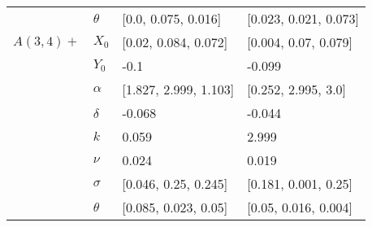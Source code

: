 \begin{tabular}{llll}
	& $\theta$ &    [0.0, 0.075, 0.016] &  [0.023, 0.021, 0.073] \\
	$A(3, 4)+$ & $X_0$ &   [0.02, 0.084, 0.072] &   [0.004, 0.07, 0.079] \\
	& $Y_0$ &                   -0.1 &                 -0.099 \\
	& $\alpha$ &  [1.827, 2.999, 1.103] &    [0.252, 2.995, 3.0] \\
	& $\delta$ &                 -0.068 &                 -0.044 \\
	& $k$ &                  0.059 &                  2.999 \\
	& $\nu$ &                  0.024 &                  0.019 \\
	& $\sigma$ &   [0.046, 0.25, 0.245] &   [0.181, 0.001, 0.25] \\
	& $\theta$ &   [0.085, 0.023, 0.05] &   [0.05, 0.016, 0.004] \\
	\bottomrule
\end{tabular}

